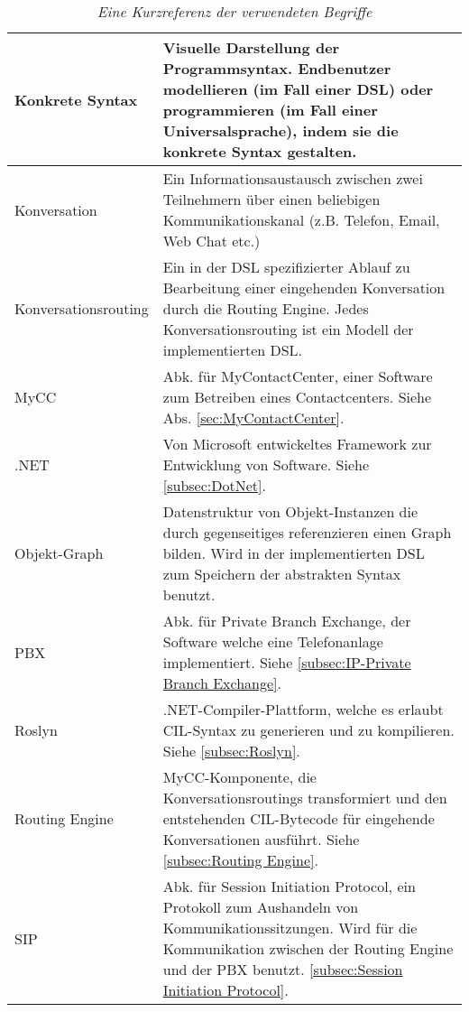 \begin{table}[hbtp]
\begin{tabulary}{1.0\textwidth}{L|L}
\hline

Konkrete Syntax & Visuelle Darstellung der Programmsyntax. Endbenutzer modellieren (im Fall einer DSL) oder programmieren (im Fall einer Universalsprache), indem sie die konkrete Syntax gestalten.\\

\hline

Konversation & Ein Informationsaustausch zwischen zwei Teilnehmern über einen beliebigen Kommunikationskanal (z.B. Telefon, Email, Web Chat etc.)\\

\hline

Konversationsrouting & Ein in der DSL spezifizierter Ablauf zu Bearbeitung einer eingehenden Konversation durch die Routing Engine. Jedes Konversationsrouting ist ein Modell der implementierten DSL.\\

\hline

MyCC & Abk. für MyContactCenter, einer Software zum Betreiben eines Contactcenters. Siehe Abs. \ref{sec:MyContactCenter}.\\

\hline

.NET & Von Microsoft entwickeltes Framework zur Entwicklung von Software. Siehe \ref{subsec:DotNet}.\\

\hline

Objekt-Graph & Datenstruktur von Objekt-Instanzen die durch gegenseitiges referenzieren einen Graph bilden. Wird in der implementierten DSL zum Speichern der abstrakten Syntax benutzt.\\

\hline

PBX & Abk. für Private Branch Exchange, der Software welche eine Telefonanlage implementiert. Siehe \ref{subsec:IP-Private Branch Exchange}.\\

\hline

Roslyn & .NET-Compiler-Plattform, welche es erlaubt CIL-Syntax zu generieren und zu kompilieren. Siehe \ref{subsec:Roslyn}.\\

\hline

Routing Engine & MyCC-Komponente, die Konversationsroutings transformiert und den entstehenden CIL-Bytecode für eingehende Konversationen ausführt. Siehe \ref{subsec:Routing Engine}.\\

\hline
SIP & Abk. für Session Initiation Protocol, ein Protokoll zum Aushandeln von Kommunikationssitzungen. Wird für die Kommunikation zwischen der Routing Engine und der PBX benutzt. \ref{subsec:Session Initiation Protocol}.  \\

\end{tabulary}
\caption{\textit{Eine Kurzreferenz der verwendeten Begriffe}}
\label{tab:kurzreferenz}
\end{table}